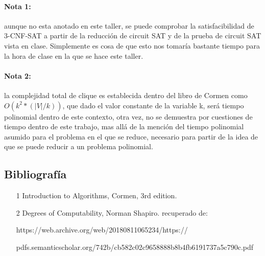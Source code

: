 \documentclass[a4paper]{article}
\begin{document}
\paragraph{Nota 1:} aunque no esta anotado en este taller, se puede comprobar la satisfacibilidad de 3-CNF-SAT
a partir de la reducción de circuit SAT y de la prueba de circuit SAT vista en clase. Simplemente es
cosa de que esto nos tomaría bastante tiempo para la hora de clase en la que se hace este taller.

\paragraph{Nota 2:} la complejidad total de clique es establecida dentro del libro de Cormen como $ O(k^2*(|V|/k)) $, que dado
el valor constante de la variable k, será tiempo polinomial dentro de este contexto, otra vez, no se demuestra por
cuestiones de tiempo dentro de este trabajo, mas allá de la mención del tiempo polinomial asumido para el problema
en el que se reduce, necesario para partir de la idea de que se puede reducir a un problema polinomial.


\subsection*{Bibliografía}
\begin{itemize}
    \item [1] Introduction to Algorithms, Cormen, 3rd edition.
    \item [2] Degrees of Computability, Norman Shapiro. recuperado de:
    
    https://web.archive.org/web/20180811065234/https://

    pdfs.semanticscholar.org/742b/cb582c02c9658888b8b4fb6191737a5c790c.pdf
\end{itemize}
\end{document}
